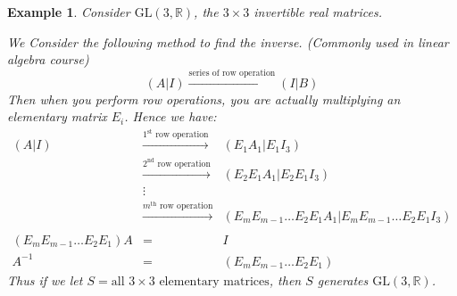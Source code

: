 \documentclass{article}
\theoremstyle{MyNonumberplain}
\theoremstyle{break}
\newcommand{\tmop}{\text}
\theoremstyle{break}
\newtheorem{example}{Example}[section]
\theoremstyle{break}
\theoremstyle{definition}
\theoremstyle{break}
\begin{document}
\begin{expbox}
    \begin{example}
        Consider $\tmop{GL} (3, \mathbb{R})$, the $3 \times 3$ invertible real
        matrices.

        We Consider the following method to find the inverse. (Commonly used in
        linear algebra course)
        \[ (A|I) \xrightarrow{\text{series of row operation}} (I|B) \]
        Then when you perform row operations, you are actually multiplying an
        elementary matrix $E_i$. Hence we have:
        \begin{eqnarray*}
        (A|I) & \xrightarrow{\text{$1^{\tmop{st}}$ row operation}} & (E_1 A_1 |E_1
        I_3)\\
        & \xrightarrow{\text{$2^{\tmop{nd}}$ row operation}} & (E_2 E_1 A_1 |E_2
        E_1 I_3)\\
        & \vdots & \\
        & \xrightarrow{\text{$m^{\tmop{th}}$ row operation}} & (E_m E_{m - 1}
        \ldots E_2 E_1 A_1 |E_m E_{m - 1} \ldots E_2 E_1 I_3)\\
        &  & \\
        (E_m E_{m - 1} \ldots E_2 E_1) A & = & I\\
        A^{- 1} & = & (E_m E_{m - 1} \ldots E_2 E_1)
        \end{eqnarray*}
        Thus if we let $S = \text{all $3 \times 3$ elementary matrices}$, then $S$
        generates $\tmop{GL} (3, \mathbb{R})$.
    \end{example}
\end{expbox}
\end{document}
